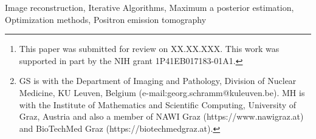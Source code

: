 \documentclass[journal,twoside,web]{ieeecolor}
\begin{document}
\title{}

\author{Georg Schramm and Martin Holler
\thanks{This paper was submitted for review on XX.XX.XXX.
This work was supported in part by the NIH grant 1P41EB017183-01A1.}
\thanks{GS is with the Department of Imaging and Pathology, Division of Nuclear Medicine,
KU Leuven, Belgium (e-mail:georg.schramm@kuleuven.be).
MH is with the Institute of Mathematics and Scientific Computing, University of Graz, Austria and
also a member of NAWI Graz (https://www.nawigraz.at) and BioTechMed Graz (https://biotechmedgraz.at).}}

\maketitle

\begin{abstract}

\end{abstract}

\begin{IEEEkeywords}
Image reconstruction, Iterative Algorithms, Maximum a posterior estimation, Optimization methods, Positron emission tomography
\end{IEEEkeywords}



\printbibliography
\end{document}
